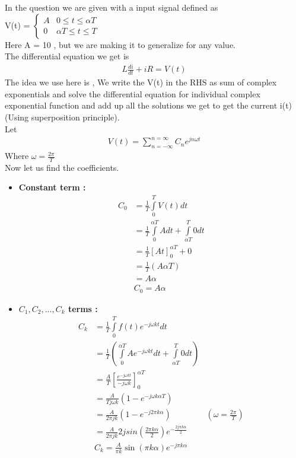 In the question we are given with a input signal defined as \\
V(t) = $\begin{cases}
A & 0\leq t \leq \alpha T \\
0 & \alpha T \leq t \leq T
\end{cases}$ \\
Here A = 10 , but we are making it to generalize for any value. \\
The differential equation we get is 
\begin{align*}
L\frac{di}{dt} + iR =V(t)
\end{align*}
The idea we use here is , We write the V(t) in the RHS as sum of complex exponentials and solve the differential equation for individual complex exponential function and add up all the solutions we get to get the current i(t) (Using superposition principle).\\
Let 
\begin{align*}
V(t) = \sum\limits_{n=-\infty}^{n=\infty} C_n e^{j n\omega t}
\end{align*}
Where $\omega = \frac{2\pi}{T}$ \\
Now let us find the coefficients.
\begin{itemize}
\item \textbf{Constant term :} 
\begin{align*}
C_0 &= \frac{1}{T}\int\limits_0^T V(t) dt \\ 
& = \frac{1}{T} \int\limits_0^{\alpha T}A dt + \int\limits_{\alpha T}^T0dt \\
& = \frac{1}{T} [At]_0^{\alpha T} + 0 \\
& = \frac{1}{T} (A \alpha T ) \\
& = A \alpha \\
&\boxed{C_0 = A\alpha}
\end{align*}
\item \textbf{$C_1,C_2,...,C_k$ terms :} 
\begin{align*}
C_k &= \frac{1}{T}\int\limits_0^Tf(t)e^{-j\omega kt}dt \\ 
& = \frac{1}{T} ( \int\limits_0^{\alpha T} A e^{-j\omega kt}dt + \int\limits_{\alpha T}^T0dt) \\
& = \frac{A}{T} [\frac{e^{-j\omega k t}}{-j\omega k }]_0^{\alpha T} \\
& = \frac{A}{Tj \omega k } (1-e^{-j \omega k \alpha T }) \\
& = \frac{A}{2 \pi j k}(1-e^{-j 2 \pi k \alpha }) & ( \omega = \frac{2 \pi}{T})\\
& =\frac{A}{2 \pi j k}2jsin(\frac{2 \pi k \alpha}{2})e^{-\frac{2 j\pi k \alpha}{2}} \\
&\boxed{C_k = \frac{A}{\pi k} \sin{(\pi k \alpha)} e ^{- j\pi k \alpha}}
\end{align*}
\end{itemize}
